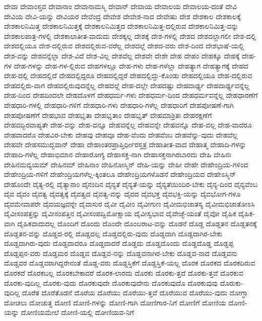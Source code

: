 {ದೇವಾ
ದೇವಾಂಸ್ತವ
ದೇವಾನಾಂ
ದೇವಾನಾಮಸ್ಮಿ
ದೇವಾನ್
ದೇವಾಯ
ದೇವಾಲಯ
ದೇವಾಲಯ-ದಂತೆ
ದೇವಿ
ದೇವಿಯ
ದೇವಿ-ಯನ್ನು
ದೇವಿಯರ
ದೇವೆಂದ್ರ
ದೇವೇಶ
ದೇವೇಶ-ನಾದ
ದೇವೇಷು
ದೇಶ
ದೇಶಕಾಲ
ದೇಶಕಾಲಕ್ಕೆ
ದೇಶಕಾಲನಿಮಿತ್ತ
ದೇಶಕಾಲನಿಮಿತ್ತಕ್ಕೆ
ದೇಶಕಾಲನಿಮಿತ್ತದ
ದೇಶಕಾಲನಿಮಿತ್ತ-ದಲ್ಲಿರುವ
ದೇಶಕಾಲನಿಮಿತ್ತ-ವನ್ನು
ದೇಶಕಾಲಪಾತ್ರ-ಗಳಲ್ಲಿ
ದೇಶಕಾಲಾತೀತ-ವಾದುದು
ದೇಶಕ್ಕಲ್ಲ
ದೇಶಕ್ಕೆ
ದೇಶ-ಗಳಲ್ಲಿ
ದೇಶದ
ದೇಶದಲ್ಲಾಗಲೀ
ದೇಶ-ದಲ್ಲಿ
ದೇಶದಲ್ಲಿಯೂ
ದೇಶ-ದಲ್ಲಿರುವ
ದೇಶದಲ್ಲಿರುವ-ವರೆಲ್ಲ
ದೇಶದಲ್ಲೆ
ದೇಶದ-ವರು
ದೇಶ-ದಿಂದ
ದೇಶಭಾಷೆ-ಯಲ್ಲಿ
ದೇಶ-ವನ್ನು
ದೇಶವನ್ನೆಲ್ಲಾ
ದೇಶ-ವಿದೆ
ದೇಶ-ವಿಲ್ಲ
ದೇಶವೆಲ್ಲ
ದೇಶವೇ
ದೇಶೇ
ದೇಹ
ದೇಹಂ
ದೇಹಕ್ಕೂ
ದೇಹಕ್ಕೆ
ದೇಹ-ಗಳ
ದೇಹ-ಗಳನ್ನು
ದೇಹ-ಗಳ-ಲ್ಲಿರುವ
ದೇಹಗಳಲ್ಲೂ
ದೇಹ-ಗಳು
ದೇಹ-ಗಳೆಲ್ಲಾ
ದೇಹತ್ಯಾಗ
ದೇಹತ್ಯಾಗಕ್ಕೆ
ದೇಹದ
ದೇಹ-ದಲ್ಲಿ
ದೇಹದಲ್ಲಿದೆ
ದೇಹದಲ್ಲಿದ್ದರೂ
ದೇಹದಲ್ಲಿದ್ದರೆ
ದೇಹದಲ್ಲಿದ್ದು-ಕೊಂಡು
ದೇಹದಲ್ಲಿಯೂ
ದೇಹ-ದಲ್ಲಿರುವ
ದೇಹದಲ್ಲಿರು-ವಾಗ
ದೇಹದಲ್ಲಿರುವುದನ್ನೆಲ್ಲ
ದೇಹದಲ್ಲೆ
ದೇಹ-ದಲ್ಲೇ
ದೇಹದಷ್ಟು
ದೇಹದಾರ್ಢ್ಯ
ದೇಹದಾರ್ಢ್ಯವನ್ನೆಲ್ಲ
ದೇಹ-ದಿಂದ
ದೇಹದಿಂದಲೇ
ದೇಹದೊಳಗೆ
ದೇಹಧರ್ಮ-ಗಳು
ದೇಹಧರ್ಮ-ದಿಂದ
ದೇಹಧರ್ಮವನ್ನೆಲ್ಲ
ದೇಹಧಾರಣೆಗೆ
ದೇಹಧಾರಿ-ಗಳಲ್ಲಿ
ದೇಹಧಾರಿ-ಗಳಿಗೆ
ದೇಹಧಾರಿ-ಗಳು
ದೇಹಧಾರಿ-ಗಳೆಲ್ಲ
ದೇಹಧಾರಿಗೆ
ದೇಹಪೋಷಣೆ-ಗಾಗಿ
ದೇಹಪೋಷಣೆಗೆ
ದೇಹಭಾವ
ದೇಹಭೃತಾ
ದೇಹಭೃತಾಂ
ದೇಹಭೃತ್
ದೇಹಮಾಶ್ರಿತಃ
ದೇಹರಕ್ಷಣೆಗೆ
ದೇಹವದ್ಭಿರವಾಪ್ಯತೇ
ದೇಹ-ವನ್ನು
ದೇಹ-ವನ್ನೂ
ದೇಹವನ್ನೆಲ್ಲ
ದೇಹವನ್ನೇ
ದೇಹವನ್ನೊ
ದೇಹ-ವಲ್ಲ
ದೇಹ-ವಾದರೂ
ದೇಹವಾದರೊ
ದೇಹವಿರ-ಬೇಕು
ದೇಹವು
ದೇಹವೂ
ದೇಹ-ವೆಂದು
ದೇಹವೆಂಬ
ದೇಹವೆನ್ನು-ವುದು
ದೇಹವೆಲ್ಲ
ದೇಹವೇ
ದೇಹಸಮುದ್ಭವಾನ್
ದೇಹಾ
ದೇಹಾಂತರಪ್ರಾಪ್ತಿರ್ಧೀರಸ್ತತ್ರ
ದೇಹಾತೀತ-ವಾದ
ದೇಹಾತ್ಮ
ದೇಹಾದಿ-ಗಳನ್ನು
ದೇಹಾದಿ-ಗಳೆಲ್ಲ
ದೇಹಾಭಿಮಾನ
ದೇಹಾರೋಗ್ಯ
ದೇಹಾಸಕ್ತ-ನಾಗಿ
ದೇಹಾಸಕ್ತನಾಗಿರಬಾರದು
ದೇಹಿ
ದೇಹಿನಃ
ದೇಹಿನಮವ್ಯಯಮ್
ದೇಹಿನಮ್
ದೇಹಿನಾಂ
ದೇಹಿನೋಸ್ಮಿನ್
ದೇಹಿ-ಯನ್ನು
ದೇಹೀ
ದೇಹೇ
ದೇಹೇಂದ್ರಿಯ-ಗಳಿಂದ
ದೇಹೇಂದ್ರಿಯ-ಗಳಿಗೆ
ದೇಹೇಂದ್ರಿಯಗಳೆಲ್ಲ-ಕ್ಕಿಂತಲೂ
ದೇಹೇಂದ್ರಿಯಗಳೊಡನೆ
ದೇಹೇಂದ್ರಿಯದ
ದೇಹೇಽಸ್ಮಿನ್
ದೇಹೊಂದೇ
ದೈತ್ಯ-ರಲ್ಲಿ
ದೈತ್ಯಾನಾಂ
ದೈನಂದಿನ
ದೈನ್ಯತೆ
ದೈನ್ಯತೆ-ಯನ್ನು
ದೈನ್ಯತೆಯಿಂದಿರ-ಬೇಕು
ದೈನ್ಯ-ದಿಂದ
ದೈನ್ಯವೆಂಬ
ದೈವ
ದೈವಂ
ದೈವತ್ವ
ದೈವತ್ವಕ್ಕೆ
ದೈವತ್ವದ
ದೈವತ್ವ-ವನ್ನು
ದೈವದ
ದೈವಭಕ್ತ
ದೈವಭಕ್ತಿ-ಯನ್ನು
ದೈವಭೋಗ-ಗಳೂ
ದೈವಮೇವಾಪರೇ
ದೈವಯಜ್ಞವನ್ನೇ
ದೈವಾಸುರ
ದೈವೀ
ದೈವೀಂ
ದೈವೀಗುಣ
ದೈವೀಮಭಿಜಾತಸ್ಯ
ದೈವೀಮಭಿಜಾತೋಽಸಿ
ದೈವೀಸಂಪತ್ತನ್ನು
ದೈವೀಸಂಪತ್ತಿನ
ದೈವೀಸಂಪದ್ವಿಮೋಕ್ಷಾಯ
ದೈವೀಸ್ವಭಾವ
ದೈವೇಚ್ಛೆ-ಯಂತೆ
ದೈವೋ
ದೈಹಿಕ
ದೈಹಿಕ-ವಾಗಿ
ದೈಹಿಕವಾದುದಲ್ಲ
ದೊಂದಿಗೆ
ದೊಂದು
ದೊಂದೇ
ದೊಂಬರಾಟ-ವನ್ನು
ದೊಡನೆ
ದೊಡ್ಡ
ದೊಡ್ಡತನ
ದೊಡ್ಡತನಕ್ಕೆ
ದೊಡ್ಡತನ-ವನ್ನು
ದೊಡ್ಡದ-ರಲ್ಲಿ
ದೊಡ್ಡದಲ್ಲ
ದೊಡ್ಡದಲ್ಲಿರು-ವುದು
ದೊಡ್ಡದಾಗಿ
ದೊಡ್ಡದಾಗಿರ-ಬೇಕು
ದೊಡ್ಡದಾಗಿರು-ವುದು
ದೊಡ್ಡದಾದರೂ
ದೊಡ್ಡದಾದರೆ
ದೊಡ್ಡದು
ದೊಡ್ಡದೊಂದು
ದೊಡ್ಡದೊಡ್ಡ
ದೊಡ್ಡಪ್ಪ
ದೊಡ್ಡಪ್ಪನ-ವರು
ದೊಡ್ಡಮರ
ದೊಡ್ಡವ
ದೊಡ್ಡವ-ನನ್ನು
ದೊಡ್ಡವನಾಗಿರ-ಬೇಕು
ದೊಡ್ಡವ-ನಾದ
ದೊಡ್ಡವನು
ದೊಡ್ಡವರ
ದೊಡ್ಡವರಾಗಿದ್ದರೇನಂತೆ
ದೊಡ್ಡ-ವರು
ದೊಡ್ಡಸ್ತಿಕೆಗೆ
ದೊಡ್ಡಸ್ತಿಕೆ-ಯಲ್ಲ
ದೊರಕ
ದೊರಕದ
ದೊರಕದಿರುವ
ದೊರಕದೆ
ದೊರಕಬಲ್ಲ
ದೊರಕಬೇಕಾದರೆ
ದೊರಕ-ಲಾರದು
ದೊರಕು
ದೊರಕು-ತ್ತದೆ
ದೊರಕು-ತ್ತವೆ
ದೊರಕುವ
ದೊರಕು-ವುದಿಲ್ಲ
ದೊರಕು-ವುದು
ದೊರಕುವುದೇ
ದೊರಕುವುದೇನು
ದೊರಕುವುದೊ
ದೊರಕುವುವು
ದೊರುಕು-ವುದಿಲ್ಲ
ದೊರೆತ
ದೊರೆತೊಡನೆ
ದೊರೆಯ
ದೊರೆಯು
ದೊರೆಯು-ತ್ತವೆ
ದೊರೆಯುವ
ದೊರೆಯು-ವುದು
ದೋಗ್ಧಾ
ದೋಚಲು
ದೋಚುತ್ತ
ದೋಣಿ
ದೋಣಿ-ಗಳನ್ನು
ದೋಣಿ-ಗಾಗಿ
ದೋಣಿಗಾರ-ನಿಗೆ
ದೋಣಿಗೆ
ದೋಣಿಯ
ದೋಣಿ-ಯನ್ನು
ದೋಣಿಯಮೇಲೆ
ದೋಣಿ-ಯಲ್ಲಿ
ದೋಣಿಯವ-ನಿಗೆ
}

